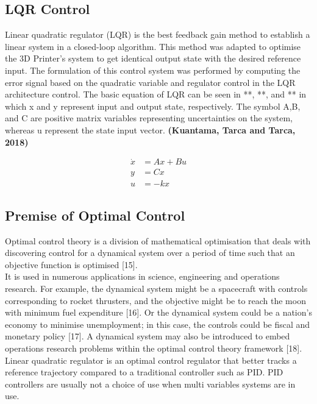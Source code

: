 \documentclass{UoNMCHA}
\numberwithin{equation}{section}
\begin{document}
	
	\subsection{LQR Control}
	
	Linear quadratic regulator (LQR) is the best feedback gain method to establish a linear system in a closed-loop algorithm. This method was adapted to optimise the 3D Printer's system to get identical output state with the desired reference input. The formulation of this control system was performed by computing the error signal based on the quadratic variable and regulator control in the LQR architecture control. The basic equation of LQR can be seen in **, **, and ** in which x and y represent input and output state, respectively. The symbol A,B, and C are positive matrix variables representing uncertainties on the system, whereas u represent the state input vector. \textbf{(Kuantama, Tarca and Tarca, 2018)}
	
	\begin{align}
	\dot{x} &= Ax + Bu \\ y&=Cx \\ u&=-kx
	\end{align}
	
	\subsection*{Premise of Optimal Control}
	
	Optimal control theory is a division of mathematical optimisation that deals with discovering control for a dynamical system over a period of time such that an objective function is optimised [15]. \\
	It is used in numerous applications in science, engineering and operations research. For example, the dynamical system might be a spacecraft with controls corresponding to rocket thrusters, and the objective might be to reach the moon with minimum fuel expenditure [16]. Or the dynamical system could be a nation's economy to minimise unemployment; in this case, the controls could be fiscal and monetary policy [17]. A dynamical system may also be introduced to embed operations research problems within the optimal control theory framework [18]. \\
	Linear quadratic regulator is an optimal control regulator that better tracks a reference trajectory compared to a traditional controller such as PID. PID controllers are usually not a choice of use when multi variables systems are in use. 
	
\end{document}
